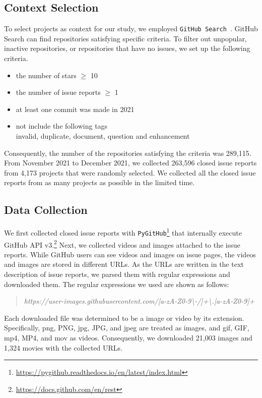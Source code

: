 \subsection{Context Selection}
\label{sec:design:context}
To select projects as context for our study, we employed \texttt{GitHub Search}~\citep{msr2021data}. GitHub Search can find repositories satisfying specific criteria. To filter out unpopular, inactive repositories, or repositories that have no issues, we set up the following criteria.
\begin{itemize}
	\item the number of stars $\geq$ 10
	\item the number of issue reports $\geq$ 1
	\item at least one commit was made in 2021
	\item not include the following tags\\invalid, duplicate, document, question and enhancement
\end{itemize}
Consequently, the number of the repositories satisfying the criteria was 289,115. From November 2021 to December 2021, we collected 263,596 closed issue reports from 4,173 projects that were randomly selected. 
We collected all the closed issue reports from as many projects as possible in the limited time.  


% 

\subsection{Data Collection}
We first collected closed issue reports with \texttt{PyGitHub}\footnote{\url{https://pygithub.readthedocs.io/en/latest/index.html}} that internally execute GitHub API v3.\footnote{\url{https://docs.github.com/en/rest}} 
Next, we collected videos and images attached to the issue reports. While GitHub users can see videos and images on issue pages, the videos and images are stored in different URLs. As the URLs are written in the text description of issue reports, we parsed them with regular expressions and downloaded them. The regular expressions we used are shown as follows:
\begin{quote}
\addtolength\leftmargini{0in}
{\it https://user-images.githubusercontent.com/[a-zA-Z0-9\textbackslash-/]+\textbackslash.[a-zA-Z0-9]+}
\end{quote}
Each downloaded file was determined to be a image or video by its extension. Specifically, png, PNG, jpg, JPG, and jpeg are treated as images, and  gif, GIF, mp4, MP4, and mov as videos.
Consequently, we downloaded 21,003 images and 1,324 movies with the collected URLs.


